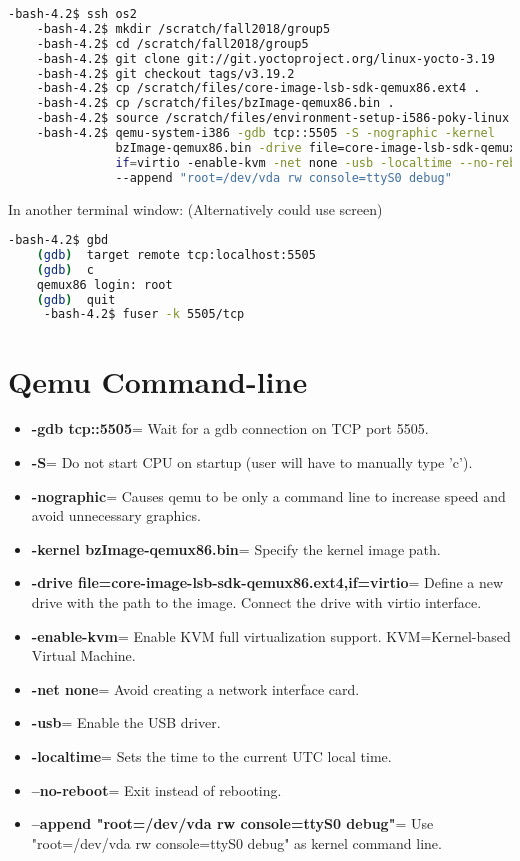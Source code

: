 \documentclass[onecolumn, draftclsnofoot,10pt, compsoc]{IEEEtran}
\begin{document}
\begin{lstlisting}[language=bash]
    -bash-4.2$ ssh os2
    -bash-4.2$ mkdir /scratch/fall2018/group5
    -bash-4.2$ cd /scratch/fall2018/group5
    -bash-4.2$ git clone git://git.yoctoproject.org/linux-yocto-3.19
    -bash-4.2$ git checkout tags/v3.19.2
    -bash-4.2$ cp /scratch/files/core-image-lsb-sdk-qemux86.ext4 .
    -bash-4.2$ cp /scratch/files/bzImage-qemux86.bin .
    -bash-4.2$ source /scratch/files/environment-setup-i586-poky-linux
    -bash-4.2$ qemu-system-i386 -gdb tcp::5505 -S -nographic -kernel
               bzImage-qemux86.bin -drive file=core-image-lsb-sdk-qemux86.ext4,
               if=virtio -enable-kvm -net none -usb -localtime --no-reboot 
               --append "root=/dev/vda rw console=ttyS0 debug"
\end{lstlisting}
In another terminal window: (Alternatively could use screen)
\begin{lstlisting}[language=bash]          
    -bash-4.2$ gbd
    (gdb)  target remote tcp:localhost:5505
    (gdb)  c
    qemux86 login: root
    (gdb)  quit
     -bash-4.2$ fuser -k 5505/tcp
\end{lstlisting}


\section{Qemu Command-line}

\begin{itemize}
    \item \textbf{-gdb tcp::5505}= Wait for a gdb connection on TCP port 5505.
    \item \textbf{-S}= Do not start CPU on startup (user will have to manually type 'c').
    \item \textbf{-nographic}= Causes qemu to be only a command line to increase speed and avoid unnecessary graphics.
    \item \textbf{-kernel bzImage-qemux86.bin}= Specify the kernel image path.
    \item \textbf{-drive file=core-image-lsb-sdk-qemux86.ext4,if=virtio}= Define a new drive with the path to the image. Connect the drive with virtio interface.
    \item \textbf{-enable-kvm}= Enable KVM full virtualization support. KVM=Kernel-based Virtual Machine.
    \item \textbf{-net none}= Avoid creating a network interface card.
    \item \textbf{-usb}= Enable the USB driver.
    \item \textbf{-localtime}= Sets the time to the current UTC local time.
    \item \textbf{--no-reboot}= Exit instead of rebooting.
    \item \textbf{--append "root=/dev/vda rw console=ttyS0 debug"}= Use "root=/dev/vda rw console=ttyS0 debug" as kernel command line.
\end{itemize}
\end{document}
